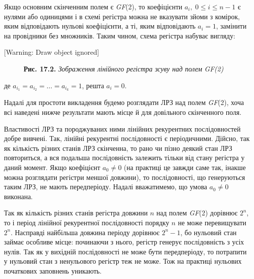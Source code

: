 Якщо основним скінченним полем є \textit{GF}(2), то коефіцієнти 
$a_i,\;0\le i\le n-1$ є нулями або одиницями і в схемі регістра можна не
вказувати зйоми з комірок, яким відповідають нульові коефіцієнти, а ті, яким
відповідають  $a_i=1$, замінити на провідники без множників. Таким чином,
схема регістра набуває вигляду:


\bigskip

[Warning: Draw object ignored]


\bigskip


\bigskip


\bigskip


\bigskip


\bigskip



\begin{figure}
\centering
\begin{minipage}{5.1425in}
\textbf{Рис. 17.2.}\textbf{\textit{ }}\textit{Зображення лінійного регістра
зсуву над полем}\textbf{\textit{ }}\textit{GF}\textit{(2)}
\end{minipage}
\end{figure}

\bigskip


\bigskip

де  $a_{i_{{1}}}=a_{i_{2}}{=\dots=a_{i_k}}{=1}$,
решта  $a_i=0$.

Надалі для простоти викладення будемо розглядати ЛРЗ над полем \textit{GF}(2),
хоча всі наведені нижче результати мають місце й для довільного скінченного
поля.

Властивості ЛРЗ та породжуваних ними лінійних рекурентних послідовностей добре
вивчені. Так, лінійні рекурентні послідовності є періодичними. Дійсно, так як
кількість різних станів ЛРЗ скінченна, то рано чи пізно деякий стан ЛРЗ
повториться, а вся подальша послідовність залежить тільки від  стану регістра у
даний момент. Якщо коефіцієнт  $a_0\neq 0$ (на практиці це завжди саме
так, інакше можна розглядати регістри меншої довжини), то послідовності, що
генеруються таким ЛРЗ, не мають передперіоду. Надалі вважатимемо, що умова 
$a_0\neq 0$ виконана. 

Так як кількість різних станів регістра довжини  $n$ над полем \textit{GF}(2)
дорівнює  $2^n$, то і період лінійної рекурентної послідовності порядку 
$n$ не може перевищувати  $2^n$. Насправді найбільша довжина періоду
дорівнює  $2^n-1$, бо нульовий стан займає особливе місце: починаючи з
нього, регістр генерує послідовність з усіх нулів. Так як у вихідній
послідовності не може бути передперіоду, то потрапити у нульовий стан з
ненульового регістр теж не може. Тож на практиці нульових початкових заповнень
уникають. 

